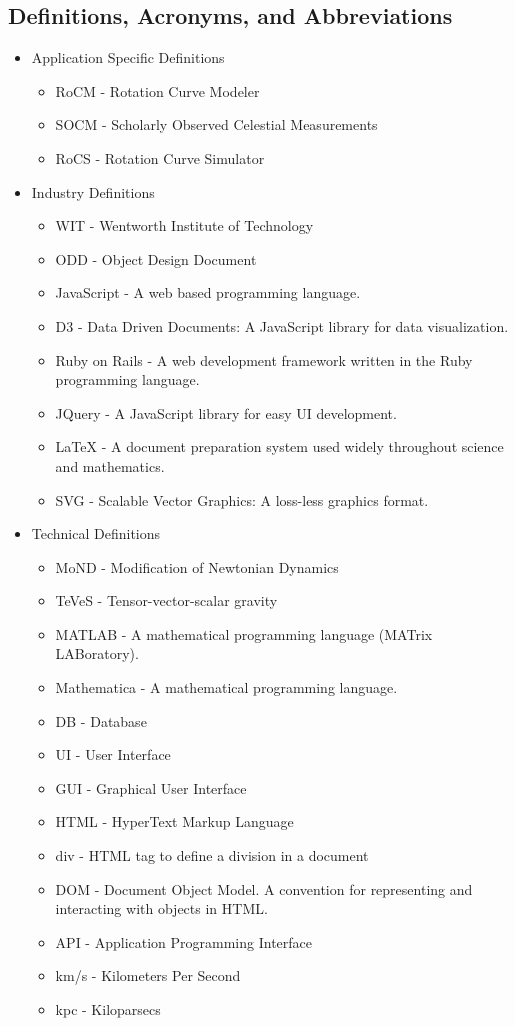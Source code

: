 \documentclass[titlepage]{article}
\begin{document}
\subsection{Definitions, Acronyms, and Abbreviations}
\begin{itemize}
	\item Application Specific Definitions
	\begin{itemize}
		\item RoCM - Rotation Curve Modeler
		\item SOCM - Scholarly Observed Celestial Measurements
		\item RoCS - Rotation Curve Simulator
	\end{itemize}
	\item Industry Definitions
	\begin{itemize}
		\item WIT - Wentworth Institute of Technology
		\item ODD - Object Design Document
		\item JavaScript - A web based programming language.
		\item D3 - Data Driven Documents: A JavaScript library for data visualization.
		\item Ruby on Rails - A web development framework written in the Ruby programming language.
		\item JQuery - A JavaScript library for easy UI development.
		\item LaTeX - A document preparation system used widely throughout science and mathematics.
		\item SVG - Scalable Vector Graphics: A loss-less graphics format.
	\end{itemize}
	\item Technical Definitions
	\begin{itemize}
        \item MoND - Modification of Newtonian Dynamics
		\item TeVeS - Tensor-vector-scalar gravity
		\item MATLAB - A mathematical programming language (MATrix LABoratory).
		\item Mathematica - A mathematical programming language.
		\item DB - Database
        \item UI - User Interface
		\item GUI - Graphical User Interface
		\item HTML - HyperText Markup Language
		\item div - HTML tag to define a division in a document
        \item DOM - Document Object Model. A convention for representing and interacting with objects in HTML.
        \item API - Application Programming Interface
        \item km/s - Kilometers Per Second
        \item kpc - Kiloparsecs
	\end{itemize}
\end{itemize}
\end{document}
